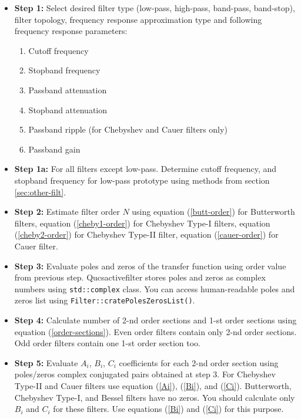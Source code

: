 \begin{itemize}
 \item \textbf{Step 1:} Select desired filter type (low-pass, high-pass,
band-pass, band-stop), filter topology, frequency response approximation type
and following frequency response parameters:
\begin{enumerate}
 \item Cutoff frequency
 \item Stopband frequency
 \item Passband attenuation
 \item Stopband attenuation
 \item Passband ripple (for Chebyshev and Cauer filters only)
 \item Passband gain
\end{enumerate}

\item \textbf{Step 1a:} For all filters except low-pass. Determine cutoff
 frequency, and stopband frequency for low-pass prototype using methods from
section \ref{sec:other-filt}. 

\item \textbf{Step 2:} Estimate filter order $N$ using equation
(\ref{butt-order}) for Butterworth filters, equation (\ref{cheby1-order}) for
Chebyshev Type-I filters, equation (\ref{cheby2-order}) for Chebyshev Type-II
filter, equation (\ref{cauer-order}) for Cauer filter.

\item \textbf{Step 3:} Evaluate poles and zeros of the transfer function using
order value from previous step. Qucsactivefilter stores poles and zeros as
complex numbers using \verb|std::complex| class. You can access human-readable
poles and zeros list using \verb|Filter::cratePolesZerosList()|.

\item \textbf{Step 4:} Calculate number of 2-nd order sections and 1-st order
sections using equation (\ref{order-sections}). Even order filters contain only
2-nd order sections. Odd order filters contain one 1-st order section too.

\item \textbf{Step 5:} Evaluate $A_i$, $B_i$, $C_i$ coefficients for each 2-nd
order section using poles/zeros complex conjugated pairs obtained at step 3.
For Chebyshev Type-II and Cauer filters use equation (\ref{Ai}), (\ref{Bi}),
and (\ref{Ci}). Butterworth, Chebyshev Type-I, and Bessel filters have no
zeros. You should calculate only $B_i$ and $C_i$ for these filters. Use
equations (\ref{Bi}) and (\ref{Ci}) for this purpose.


\end{itemize}
